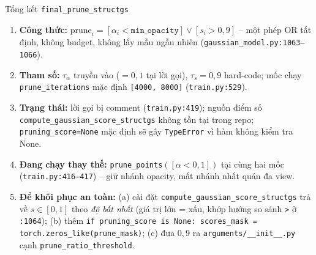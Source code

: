 \begin{frame}{Tổng kết \texttt{final\_prune\_structgs}}
\footnotesize
\begin{enumerate}
    \item \textbf{Công thức:} $\text{prune}_i=[\alpha_i<\texttt{min\_opacity}]\vee[s_i>0{,}9]$ -- một phép OR tất định, không budget, không lấy mẫu ngẫu nhiên (\texttt{gaussian\_model.py:1063--1066}).
    \item \textbf{Tham số:} $\tau_\alpha$ truyền vào ($=0{,}1$ tại lời gọi), $\tau_s=0{,}9$ hard-code; mốc chạy \texttt{prune\_iterations} mặc định \texttt{[4000, 8000]} (\texttt{train.py:529}).
    \item \textbf{Trạng thái:} lời gọi bị comment (\texttt{train.py:419}); nguồn điểm số \texttt{compute\_gaussian\_score\_structgs} \alert{không tồn tại trong repo}; \texttt{pruning\_score=None} mặc định sẽ gây \texttt{TypeError} vì hàm không kiểm tra None.
    \item \textbf{Đang chạy thay thế:} \texttt{prune\_points}$([\alpha<0{,}1])$ tại cùng hai mốc (\texttt{train.py:416--417}) -- giữ nhánh opacity, mất nhánh nhất quán đa view.
    \item \textbf{Để khôi phục an toàn:} (a) cài đặt \texttt{compute\_gaussian\_score\_structgs} trả về $s\in[0,1]$ theo \emph{độ bất nhất} (giá trị lớn = xấu, khớp hướng so sánh \texttt{>} ở \texttt{:1064}); (b) thêm \texttt{if pruning\_score is None: scores\_mask = torch.zeros\_like(prune\_mask)}; (c) đưa $0{,}9$ ra \texttt{arguments/\_\_init\_\_.py} cạnh \texttt{prune\_ratio\_threshold}.
\end{enumerate}
\end{frame}
